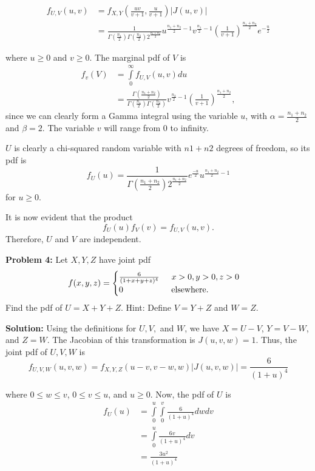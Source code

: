 \documentclass{article}
\newcommand{\mybox}{%
    \collectbox{%
        \setlength{\fboxsep}{1pt}%
        \fbox{\BOXCONTENT}%
    }%
}
\begin{document}
\begin{align*}
f_{U,V}(u,v) &= f_{X,Y}\left(\frac{uv}{v+1}, \frac{u}{v+1}\right)|J(u,v)| \\
&= \frac{1}{\Gamma\left(\frac{n_1}{2}\right)\Gamma\left(\frac{n_2}{2}\right)2^{\frac{n_1+n_2}{2}}}u^{\frac{n_1+n_2}{2}-1}v^{\frac{n_1}{2}-1}\left(\frac{1}{v+1}\right)^{\frac{n_1+n_2}{2}}e^{-\frac{u}{2}}
\end{align*}

\noindent where $u\geq 0$ and $v\geq 0$.  The marginal pdf of $V$ is  
\begin{align*}
f_v(V) &= \int\limits_0^{\infty}f_{U,V}(u,v) du \\
&= \frac{\Gamma\left( \frac{n_1+n_2}{2}\right)}{\Gamma\left(\frac{n_1}{2}\right)\Gamma\left(\frac{n_2}{2}\right)}v^{\frac{n_2}{2}-1}\left(\frac{1}{v+1}\right)^{\frac{n_1+n_2}{2}},
\end{align*}
since we can clearly form a Gamma integral using the variable $u$, with $\alpha = \frac{n_1+n_2}{2}$ and $\beta = 2$.  The variable $v$ will range from $0$ to infinity. 

\noindent $U$ is clearly a chi-squared random variable with $n1+n2$ degrees of freedom, so its pdf is 
$$
f_U(u) = \frac{1}{\Gamma\left(\frac{n_1+n_2}{2}\right)2^{\frac{n_1+n_2}{2}}}e^{\frac{-u}{2}}u^{\frac{n_1+n_2}{2}-1}
$$
for $u\geq 0$.

\noindent It is now evident that the product $$f_U(u)f_V(v) = f_{U,V}(u,v).$$  Therefore, $U$ and $V$ are independent.

\pagebreak

\noindent\mybox{\textbf{Problem 4:}}  Let $X, Y, Z$ have joint pdf $$f(x,y,z) =
\begin{cases}
\frac{6}{(1+x+y+z)^4} \hspace{5mm} x > 0, y > 0, z > 0 \\
0 \hspace{20mm} \text{elsewhere.}
\end{cases}
$$
Find the pdf of $U = X+Y+Z$.  Hint:  Define $V=Y+Z$ and $W=Z$.  

\vspace{5mm}

\noindent\mybox{\textbf{Solution:}}  Using the definitions for $U, V,$ and $W$, we have $X = U - V$, $Y = V - W$, and $Z = W$.  The Jacobian of this transformation is $J(u,v,w) = 1$.  Thus, the joint pdf of $U, V, W$ is 
$$
f_{U,V,W}(u,v,w) = f_{X,Y,Z}(u-v, v-w, w)|J(u,v,w)| = \frac{6}{(1+u)^4}
$$

\noindent where $0 \leq w \leq v$, $0 \leq v \leq u$, and $u \geq 0$.  Now, the pdf of $U$ is 
\begin{align*}
f_U(u) &= \int\limits_0^u\int\limits_0^v \frac{6}{(1+u)^4}dwdv \\
&= \int\limits_0^u\frac{6v}{(1+u)^4} dv \\
&= \frac{3u^2}{(1+u)^4}
\end{align*}
\end{document}
